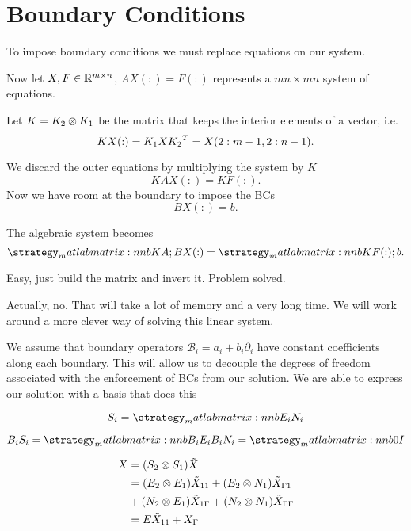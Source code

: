 \section{Boundary Conditions}
\begin{frame}{To impose boundary conditions we must replace equations on our system.}

Now let $X,F\in\mathbb{R}^{m\times n}$, $AX(:)=F(:)$ represents a $mn\times mn$ system of equations.

Let $K=K_2\otimes K_1$ be the matrix that keeps the interior elements of a vector, i.e.
\begin{equation*}
KX(:)=K_1 X {K_2}^{T}=X(2:m-1,2:n-1).
\end{equation*}	

We discard the outer equations by multiplying the system by $K$ 
\begin{equation*}
KAX(:)=KF(:).
\end{equation*}
Now  we have room at the boundary to impose the BCs
\begin{equation*}
BX(:)=b.
\end{equation*}

\end{frame}

\begin{frame}{The algebraic system becomes}
\begin{equation*}
\matlabmatrix{KA; B}X(:)=\matlabmatrix{KF(:); b}.
\end{equation*}

\bigskip
Easy, just build the matrix and invert it. Problem solved.

\bigskip
Actually, no. That will take a lot of memory and a very long time. We will work around a more clever way of solving this linear system.
\end{frame}


\begin{frame}
We assume that boundary operators $\mathcal{B}_i=a_i+b_i \partial_i$ have constant coefficients along each boundary. This will allow us to decouple the degrees of freedom associated with the enforcement of BCs from our solution. We are able to express our solution with a basis that does this

\begin{equation*}
S_i=\matlabmatrix{E_i N_i}
\end{equation*}

\begin{equation*}
B_iS_i=\matlabmatrix{B_iE_i B_iN_i}=\matlabmatrix{0 I}
\end{equation*}

\begin{align*}
X&=(S_2\otimes S_1) \tilde{X} \\
&=(E_2\otimes E_1)\tilde{X}_{11}
+(E_2\otimes N_1)\tilde{X}_{\Gamma 1}\\
&+(N_2\otimes E_1)\tilde{X}_{1\Gamma}
+(N_2\otimes N_1)\tilde{X}_{\Gamma \Gamma}\\
&=E \tilde{X}_{11} + X_\Gamma
\end{align*}

\end{frame}

